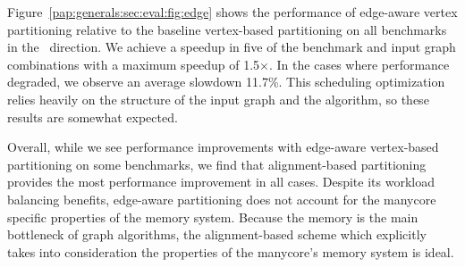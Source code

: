 Figure~\ref{pap:generals:sec:eval:fig:edge} shows the performance of edge-aware vertex partitioning relative to the baseline vertex-based partitioning on all benchmarks in the \pull~direction. 
We achieve a speedup in five of the benchmark and input graph combinations with a maximum speedup of 1.5$\times$.
In the cases where performance degraded, we observe an average slowdown 11.7\%. 
This scheduling optimization relies heavily on the structure of the input graph and the algorithm, so these results are somewhat expected.
 
Overall, while we see performance improvements with edge-aware vertex-based partitioning on some benchmarks, we find that alignment-based partitioning provides the most performance improvement in all cases. 
Despite its workload balancing benefits, edge-aware partitioning does not account for the manycore specific properties of the memory system.
Because the memory is the main bottleneck of graph algorithms, the alignment-based scheme which explicitly takes into consideration the properties of the manycore's memory system is ideal. 
 
 



